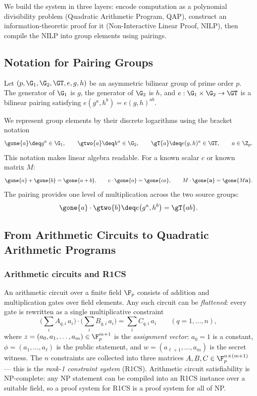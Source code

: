 We build the system in three layers: encode computation as a polynomial divisibility problem (Quadratic Arithmetic Program, QAP), construct an information-theoretic proof for it (Non-Interactive Linear Proof, NILP), then compile the NILP into group elements using pairings.

\subsection{Notation for Pairing Groups}

Let $(p, \G_1, \G_2, \GT, e, g, h)$ be an asymmetric bilinear group of prime order $p$. The generator of $\G_1$ is $g$, the generator of $\G_2$ is $h$, and $e : \G_1 \times \G_2 \to \GT$ is a bilinear pairing satisfying $e(g^a, h^b) = e(g,h)^{ab}$.

We represent group elements by their discrete logarithms using the bracket notation
\[
  \gone{a} \deq g^a \in \G_1, \qquad
  \gtwo{a} \deq h^a \in \G_2, \qquad
  \gT{a}   \deq e(g,h)^a \in \GT, \qquad a \in \Z_p.
\]
This notation makes linear algebra readable. For a known scalar $c$ or known matrix $M$:
\[
  \gone{a} + \gone{b} = \gone{a+b}, \qquad
  c \cdot \gone{a} = \gone{ca}, \qquad
  M \cdot \gone{\mathbf{a}} = \gone{M\mathbf{a}}.
\]
The pairing provides one level of multiplication across the two source groups:
\[
  \gone{a} \cdot \gtwo{b} \deq e\!\left(g^a, h^b\right) = \gT{ab}.
\]


\subsection{From Arithmetic Circuits to Quadratic Arithmetic Programs}

\subsubsection*{Arithmetic circuits and R1CS}

An arithmetic circuit over a finite field $\F_p$ consists of addition and multiplication gates over field elements. Any such circuit can be \emph{flattened}: every gate is rewritten as a single multiplicative constraint
\[
  \bigl(\textstyle\sum_i A_{q,i}\, a_i\bigr)
  \cdot
  \bigl(\textstyle\sum_i B_{q,i}\, a_i\bigr)
  =
  \textstyle\sum_i C_{q,i}\, a_i
  \qquad (q = 1,\ldots, n),
\]
where $z = (a_0, a_1, \ldots, a_m) \in \F_p^{m+1}$ is the \emph{assignment vector}: $a_0 = 1$ is a constant, $\phi = (a_1, \ldots, a_\ell)$ is the public statement, and $w = (a_{\ell+1}, \ldots, a_m)$ is the secret witness. The $n$ constraints are collected into three matrices $A, B, C \in \F_p^{n \times (m+1)}$ --- this is the \emph{rank-1 constraint system} (R1CS). Arithmetic circuit satisfiability is NP-complete: any NP statement can be compiled into an R1CS instance over a suitable field, so a proof system for R1CS is a proof system for all of NP.

